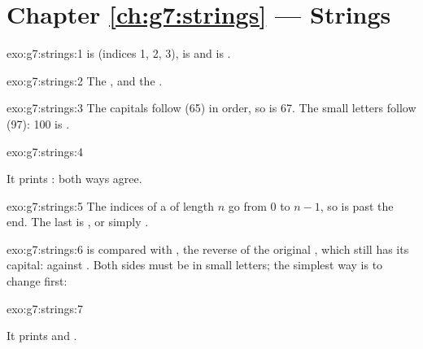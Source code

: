 \section*{Chapter \ref{ch:g7:strings} --- Strings}

\begin{solution}{exo:g7:strings:1}
 is  (indices 1, 2, 3),  is  and
 is .
\end{solution}

\begin{solution}{exo:g7:strings:2}
The  \code{["a", "b", "c"]}, and the  .
\end{solution}

\begin{solution}{exo:g7:strings:3}
The capitals follow  (65) in order, so  is 67. The small
letters follow  (97): 100 is .
\end{solution}

\begin{solution}{exo:g7:strings:4}
\label{lst:g7:strings:sol-spaces}

It prints : both ways agree.
\end{solution}

\begin{solution}{exo:g7:strings:5}
The indices of a  of length $n$ go from 0 to $n - 1$, so 
 is past the end. The last  is , or
simply .
\end{solution}

\begin{solution}{exo:g7:strings:6}
 is compared with , the reverse of the original
, which still has its capital:  against . Both
sides must be in small letters; the simplest way is to change  first:

\label{lst:g7:strings:sol-palindrome}
\end{solution}

\begin{solution}{exo:g7:strings:7}
\label{lst:g7:strings:sol-initials}

It prints  and .
\end{solution}

